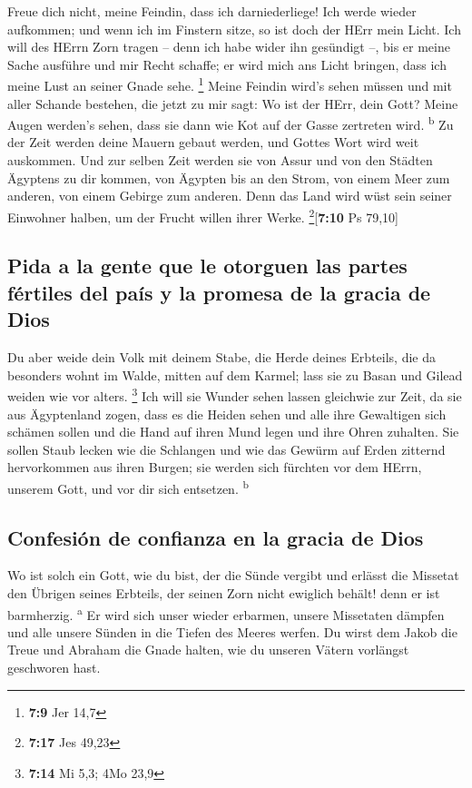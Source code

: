  Freue dich nicht, meine Feindin, dass ich darniederliege!
Ich werde wieder aufkommen; und wenn ich im Finstern sitze, so ist doch
der HErr mein Licht.  Ich will des HErrn Zorn tragen --
denn ich habe wider ihn gesündigt --, bis er meine Sache ausführe und
mir Recht schaffe; er wird mich ans Licht bringen, dass ich meine Lust
an seiner Gnade sehe. \footnote{\textbf{7:9} Jer 14,7} 
Meine Feindin wird's sehen müssen und mit aller Schande bestehen, die
jetzt zu mir sagt: Wo ist der HErr, dein Gott? Meine Augen werden's
sehen, dass sie dann wie Kot auf der Gasse zertreten wird.
\textsuperscript{b}  Zu der Zeit werden deine Mauern
gebaut werden, und Gottes Wort wird weit auskommen.  Und
zur selben Zeit werden sie von Assur und von den Städten Ägyptens zu dir
kommen, von Ägypten bis an den Strom, von einem Meer zum anderen, von
einem Gebirge zum anderen.  Denn das Land wird wüst sein
seiner Einwohner halben, um der Frucht willen ihrer Werke.
\footnote{\textbf{7:17} Jes 49,23}{[}\textbf{7:10} Ps 79,10{]}

\hypertarget{pida-a-la-gente-que-le-otorguen-las-partes-fuxe9rtiles-del-pauxeds-y-la-promesa-de-la-gracia-de-dios}{%
\subsection{Pida a la gente que le otorguen las partes fértiles del país
y la promesa de la gracia de
Dios}\label{pida-a-la-gente-que-le-otorguen-las-partes-fuxe9rtiles-del-pauxeds-y-la-promesa-de-la-gracia-de-dios}}

 Du aber weide dein Volk mit deinem Stabe, die Herde
deines Erbteils, die da besonders wohnt im Walde, mitten auf dem Karmel;
lass sie zu Basan und Gilead weiden wie vor alters. \footnote{\textbf{7:14}
  Mi 5,3; 4Mo 23,9}  Ich will sie Wunder sehen lassen
gleichwie zur Zeit, da sie aus Ägyptenland zogen,  dass
es die Heiden sehen und alle ihre Gewaltigen sich schämen sollen und die
Hand auf ihren Mund legen und ihre Ohren zuhalten.  Sie
sollen Staub lecken wie die Schlangen und wie das Gewürm auf Erden
zitternd hervorkommen aus ihren Burgen; sie werden sich fürchten vor dem
HErrn, unserem Gott, und vor dir sich entsetzen. \textsuperscript{b}

\hypertarget{confesiuxf3n-de-confianza-en-la-gracia-de-dios}{%
\subsection{Confesión de confianza en la gracia de
Dios}\label{confesiuxf3n-de-confianza-en-la-gracia-de-dios}}

 Wo ist solch ein Gott, wie du bist, der die Sünde
vergibt und erlässt die Missetat den Übrigen seines Erbteils, der seinen
Zorn nicht ewiglich behält! denn er ist barmherzig. \textsuperscript{a}
 Er wird sich unser wieder erbarmen, unsere Missetaten
dämpfen und alle unsere Sünden in die Tiefen des Meeres werfen.
 Du wirst dem Jakob die Treue und Abraham die Gnade
halten, wie du unseren Vätern vorlängst geschworen hast.
